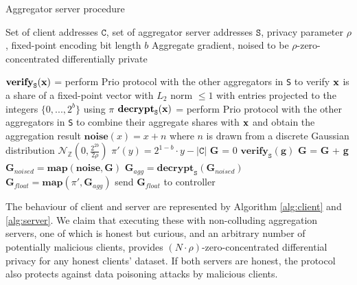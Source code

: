 \documentclass{article}
\begin{document}
\begin{algorithm}[h]
  \caption{Aggregator server procedure}\label{alg:server}
  \begin{algorithmic}[1]
  \Require Set of client addresses $\texttt{C}$, set of aggregator server addresses $\texttt{S}$, privacy parameter $\rho$, fixed-point encoding bit length $b$
  \Ensure Aggregate gradient, noised to be $\rho$-zero-concentrated differentially private

  \State$\textbf{verify}_{\texttt{S}}(\textbf x)$ = perform Prio protocol with the other aggregators in \texttt{S} to verify $\textbf x$ is a share of a fixed-point vector with $L_2$ norm $\leq 1$ with entries projected to the integers $\{0,...,2^b\}$ using $\pi$
  \State$\textbf{decrypt}_{\texttt{S}}(\textbf x)$ = perform Prio protocol with the other aggregators in \texttt{S} to combine their aggregate shares with $\textbf x$ and obtain the aggregation result
  \State$\textbf{noise}(x) = x+n$ where $n$ is drawn from a discrete Gaussian distribution $\mathcal N_\mathbb{Z}\left(0,\frac{2^{2b}}{2\rho}\right)$
  \State$\pi'(y) = 2^{1-b} \cdot y - |\texttt{C}|$ 
  \State\textbf{G} = 0
	   \State$\textbf{verify}_\texttt{S}(\textbf{g})$ \label{lst:line:verify}
	   \State\textbf{G} = \textbf{G} + \textbf{g}
  \EndFor
  \State$\textbf{G}_{noised} = \textbf{map}(\textbf{noise}, \textbf{G})$   \label{lst:line:noise}
  \State$\textbf{G}_{agg} = \textbf{decrypt}_{\texttt{S}}(\textbf{G}_{noised})$ 
  \State$\textbf{G}_{float} = \textbf{map}(\pi', \textbf{G}_{agg})$ 
  \State send $\textbf{G}_{float}$ to controller
  \end{algorithmic}
\end{algorithm}


The behaviour of client and server are represented by Algorithm \ref{alg:client} and \ref{alg:server}.
We claim that executing these with non-colluding aggregation
servers, one of which is honest but curious, and an arbitrary number of
potentially malicious clients, provides $(N \cdot \rho)$-zero-concentrated
differential privacy for any honest clients' dataset. If both servers are
honest, the protocol also protects against data poisoning attacks by malicious
clients.
\end{document}
